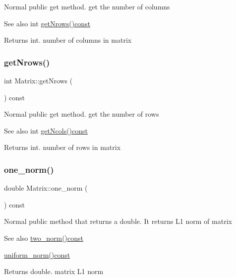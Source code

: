 Normal public get method. get the number of columns \begin{DoxySeeAlso}{See also}
int \mbox{\hyperlink{class_matrix_a711f84a1c62832d9d197d78c9855a276}{get\+Nrows()const}} 
\end{DoxySeeAlso}
\begin{DoxyReturn}{Returns}
int. number of columns in matrix 
\end{DoxyReturn}
\mbox{\label{class_matrix_a711f84a1c62832d9d197d78c9855a276}} 
\subsubsection{\texorpdfstring{get\+Nrows()}{getNrows()}}
{\footnotesize\ttfamily int Matrix\+::get\+Nrows (\begin{DoxyParamCaption}{ }\end{DoxyParamCaption}) const}

Normal public get method. get the number of rows \begin{DoxySeeAlso}{See also}
int \mbox{\hyperlink{class_matrix_ae0a5f2154953b8d129a90b04f91d9079}{get\+Ncols()const}} 
\end{DoxySeeAlso}
\begin{DoxyReturn}{Returns}
int. number of rows in matrix 
\end{DoxyReturn}
\mbox{\label{class_matrix_af4d468252f3ecbbcaa5726c76e332b4c}} 
\subsubsection{\texorpdfstring{one\+\_\+norm()}{one\_norm()}}
{\footnotesize\ttfamily double Matrix\+::one\+\_\+norm (\begin{DoxyParamCaption}{ }\end{DoxyParamCaption}) const}

Normal public method that returns a double. It returns L1 norm of matrix \begin{DoxySeeAlso}{See also}
\mbox{\hyperlink{class_matrix_aac496af05ec7aa26afc2b9c6d0ab8b66}{two\+\_\+norm()const}} 

\mbox{\hyperlink{class_matrix_a43066c7fe6418aad40170b85415063e8}{uniform\+\_\+norm()const}} 
\end{DoxySeeAlso}
\begin{DoxyReturn}{Returns}
double. matrix L1 norm 
\end{DoxyReturn}
\mbox{\label{class_matrix_aaa40c78e6b3bb5bbf572d35612dbf6a7}} 
